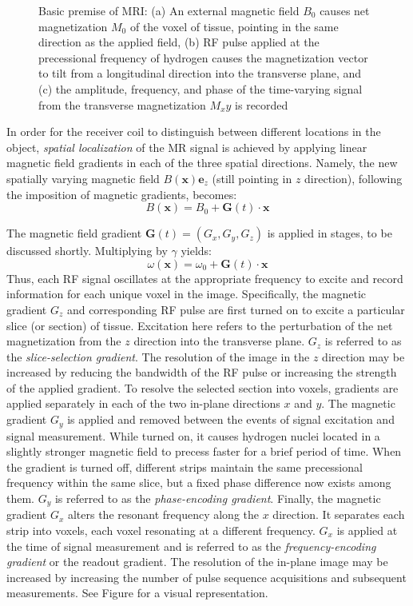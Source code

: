 \begin{figure}[ht]
{\label{fig:mr23}}
%
\caption{Basic premise of MRI: (a) An external magnetic field $B_0$ causes net magnetization $M_0$ of the voxel of tissue, pointing in the same direction as the applied field, (b) RF pulse applied at the precessional frequency of hydrogen causes the magnetization vector to tilt from a longitudinal direction into the transverse plane, and (c) the amplitude, frequency, and phase of the time-varying signal from the transverse magnetization $M_xy$ is recorded~\cite{hendrick_1994}}
\label{fig:mr2}
\end{figure}

In order for the receiver coil to distinguish between different locations in the object, \textit{spatial localization} of the MR signal is achieved by applying linear magnetic field gradients in each of the three spatial directions. Namely, the new spatially varying magnetic field $B(\bm{x})\bm{e}_z$ (still pointing in $z$ direction), following the imposition of magnetic gradients, becomes:
\begin{equation}
B(\bm{x}) = B_0 + \bm{G}(t) \cdot \bm{x}
\label{eqn:gradient}
\end{equation}

The magnetic field gradient $\bm{G}(t) = (G_x, G_y, G_z)$ is applied in stages, to be discussed shortly. Multiplying  by $\gamma$ yields:
\begin{equation}
\omega(\bm{x}) = \omega_0 + \bm{G}(t) \cdot \bm{x}
\label{eqn:freq}
\end{equation}
Thus, each RF signal oscillates at the appropriate frequency to excite and record information for each unique voxel in the image. Specifically, the magnetic gradient $G_z$ and corresponding RF pulse are first turned on to excite a particular slice (or section) of tissue. Excitation here refers to the perturbation of the net magnetization from the $z$ direction into the transverse plane. $G_z$ is referred to as the \textit{slice-selection gradient}. The resolution of the image in the $z$ direction may be increased by reducing the bandwidth of the RF pulse or increasing the strength of the applied gradient. To resolve the selected section into voxels, gradients are applied separately in each of the two in-plane directions $x$ and $y$. The magnetic gradient $G_y$ is applied and removed between the events of signal excitation and signal measurement. While turned on, it causes hydrogen nuclei located in a slightly stronger magnetic field to precess faster for a brief period of time. When the gradient is turned off, different strips maintain the same precessional frequency within the same slice, but a fixed phase difference now exists among them. $G_y$ is referred to as the \textit{phase-encoding gradient}. Finally, the magnetic gradient $G_x$ alters the resonant frequency along the $x$ direction. It separates each strip into voxels, each voxel resonating at a different frequency. $G_x$ is applied at the time of signal measurement and is referred to as the  \textit{frequency-encoding gradient} or the {readout gradient}. The resolution of the in-plane image may be increased by increasing the number of pulse sequence acquisitions and subsequent measurements. See Figure  for a visual representation.

